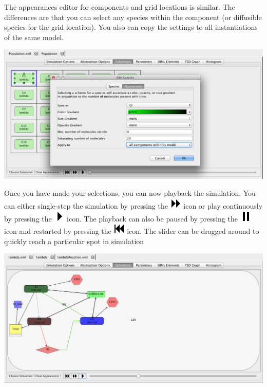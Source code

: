 \documentclass[titlepage,11pt]{article}
\begin{document}
The appearances editor for components and grid locations is similar.  The differences are that you can select any species within the component (or diffusible species for the grid location).  You also can copy the settings to all instantiations of the same model.

\begin{center}
\includegraphics[width=160mm]{screenshots/compAppearances}
\end{center}

Once you have made your selections, you can now playback the simulation.  You can either single-step the simulation by pressing the \includegraphics{../gui/icons/modelview/movie/single_step} icon or play continuously by pressing the \includegraphics{../gui/icons/modelview/movie/play} icon.  The playback can also be paused by pressing the \includegraphics{../gui/icons/modelview/movie/pause} icon and restarted by pressing the  \includegraphics{../gui/icons/modelview/movie/rewind} icon.  The slider can be dragged around to quickly reach a particular spot in simulation

\begin{center}
\includegraphics[width=160mm]{screenshots/movieView}
\end{center}
\end{document}
